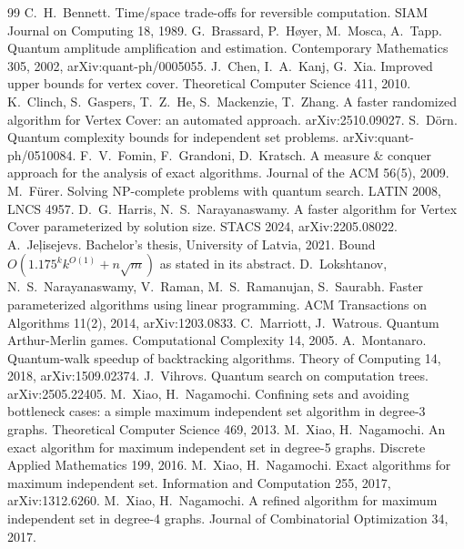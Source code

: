 \documentclass[11pt]{article}
\theoremstyle{definition}
\theoremstyle{remark}
\begin{document}
\begin{thebibliography}{99}
 C.~H.~Bennett. Time/space trade-offs for reversible computation. SIAM Journal on Computing 18, 1989.
 G.~Brassard, P.~H\o yer, M.~Mosca, A.~Tapp. Quantum amplitude amplification and estimation. Contemporary Mathematics 305, 2002, arXiv:quant-ph/0005055.
 J.~Chen, I.~A.~Kanj, G.~Xia. Improved upper bounds for vertex cover. Theoretical Computer Science 411, 2010.
 K.~Clinch, S.~Gaspers, T.~Z.~He, S.~Mackenzie, T.~Zhang. A faster randomized algorithm for Vertex Cover: an automated approach. arXiv:2510.09027.
 S.~D\"orn. Quantum complexity bounds for independent set problems. arXiv:quant-ph/0510084.
 F.~V.~Fomin, F.~Grandoni, D.~Kratsch. A measure \& conquer approach for the analysis of exact algorithms. Journal of the ACM 56(5), 2009.
 M.~F\"urer. Solving NP-complete problems with quantum search. LATIN 2008, LNCS 4957.
 D.~G.~Harris, N.~S.~Narayanaswamy. A faster algorithm for Vertex Cover parameterized by solution size. STACS 2024, arXiv:2205.08022.
 A.~Je\c{l}isejevs. Bachelor's thesis, University of Latvia, 2021. Bound $O(1.175^kk^{O(1)}+n\sqrt m)$ as stated in its abstract.
 D.~Lokshtanov, N.~S.~Narayanaswamy, V.~Raman, M.~S.~Ramanujan, S.~Saurabh. Faster parameterized algorithms using linear programming. ACM Transactions on Algorithms 11(2), 2014, arXiv:1203.0833.
 C.~Marriott, J.~Watrous. Quantum Arthur-Merlin games. Computational Complexity 14, 2005.
 A.~Montanaro. Quantum-walk speedup of backtracking algorithms. Theory of Computing 14, 2018, arXiv:1509.02374.
 J.~Vihrovs. Quantum search on computation trees. arXiv:2505.22405.
 M.~Xiao, H.~Nagamochi. Confining sets and avoiding bottleneck cases: a simple maximum independent set algorithm in degree-3 graphs. Theoretical Computer Science 469, 2013.
 M.~Xiao, H.~Nagamochi. An exact algorithm for maximum independent set in degree-5 graphs. Discrete Applied Mathematics 199, 2016.
 M.~Xiao, H.~Nagamochi. Exact algorithms for maximum independent set. Information and Computation 255, 2017, arXiv:1312.6260.
 M.~Xiao, H.~Nagamochi. A refined algorithm for maximum independent set in degree-4 graphs. Journal of Combinatorial Optimization 34, 2017.
\end{thebibliography}
\end{document}
